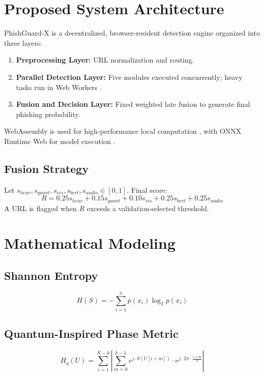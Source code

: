 \documentclass[conference]{IEEEtran}
\begin{document}
\section{Proposed System Architecture}
PhishGuard-X is a decentralized, browser-resident detection engine organized into three layers:
\begin{enumerate}
\item \textbf{Preprocessing Layer:} URL normalization and routing.
\item \textbf{Parallel Detection Layer:} Five modules executed concurrently; heavy tasks run in Web Workers \cite{b41}.
\item \textbf{Fusion and Decision Layer:} Fixed weighted late fusion to generate final phishing probability.
\end{enumerate}

WebAssembly is used for high-performance local computation \cite{b39}, with ONNX Runtime Web for model execution \cite{b40}.

\subsection{Fusion Strategy}
Let $s_{heur}, s_{quant}, s_{vis}, s_{bert}, s_{audio} \in [0,1]$. Final score:
\begin{equation}
R = 0.25 s_{heur} + 0.15 s_{quant} + 0.10 s_{vis} + 0.25 s_{bert} + 0.25 s_{audio}
\end{equation}
A URL is flagged when $R$ exceeds a validation-selected threshold.

\section{Mathematical Modeling}
\subsection{Shannon Entropy}
\begin{equation}
H(S) = -\sum_{i=1}^{n} p(x_i) \log_2 p(x_i)
\end{equation}

\subsection{Quantum-Inspired Phase Metric}
\begin{equation}
H_q(U)=\sum_{i=1}^{N-k} \left| \sum_{m=0}^{k-1} e^{j\cdot\theta(U[i+m])}\cdot e^{j\cdot2\pi\cdot\frac{i+m}{N}} \right|
\end{equation}
\end{document}
